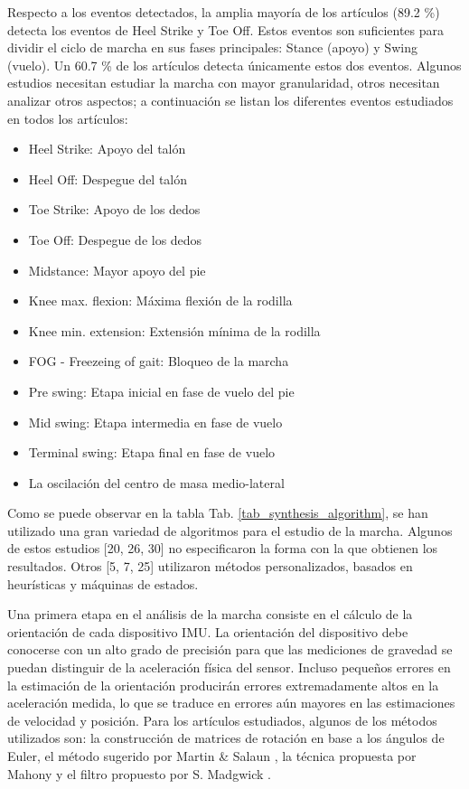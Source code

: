 Respecto a los eventos detectados, la amplia mayoría de los artículos (89.2 \%) detecta los eventos de Heel Strike y Toe Off. Estos eventos son suficientes para dividir el ciclo de marcha en sus fases principales: Stance (apoyo) y Swing (vuelo). Un  60.7 \% de los artículos detecta únicamente estos dos eventos. Algunos estudios necesitan estudiar la marcha con mayor granularidad, otros necesitan analizar otros aspectos; a continuación se listan los diferentes eventos estudiados en todos los artículos: 

\begin{itemize}
    \item Heel Strike: Apoyo del talón 
    \item Heel Off: Despegue del talón 
    \item Toe Strike: Apoyo de los dedos 
    \item Toe Off: Despegue de los dedos 
    \item Midstance: Mayor apoyo del pie 
    \item Knee max. flexion: Máxima flexión de la rodilla 
    \item Knee min. extension: Extensión mínima de la rodilla
    \item FOG - Freezeing of gait: Bloqueo de la marcha 
    \item Pre swing: Etapa inicial en fase de vuelo del pie 
    \item Mid swing: Etapa intermedia en fase de vuelo 
    \item Terminal swing: Etapa final en fase de vuelo
    \item La oscilación del centro de masa medio-lateral
\end{itemize}


Como se puede observar en la tabla Tab. \ref{tab_synthesis_algorithm}, se han utilizado una gran variedad de algoritmos para el estudio de la marcha. Algunos de estos estudios [20, 26, 30] no especificaron la forma con la que obtienen los resultados. Otros [5, 7, 25] utilizaron métodos personalizados, basados en heurísticas y máquinas de estados.


Una primera etapa en el análisis de la marcha consiste en el cálculo de la orientación de cada dispositivo IMU. La orientación del dispositivo debe conocerse con un alto grado de precisión para que las mediciones de gravedad se puedan distinguir de la aceleración física del sensor. Incluso pequeños errores en la estimación de la orientación producirán errores extremadamente altos en la aceleración medida, lo que se traduce en errores aún mayores en las estimaciones de velocidad y posición. Para los artículos estudiados, algunos de los métodos utilizados son: la construcción de matrices de rotación en base a los ángulos de Euler, el método sugerido por Martin \& Salaun \cite{Martin2010}, la técnica propuesta por Mahony \cite{Mahony2006} y el filtro propuesto por S. Madgwick \cite{Madgwick}. 


